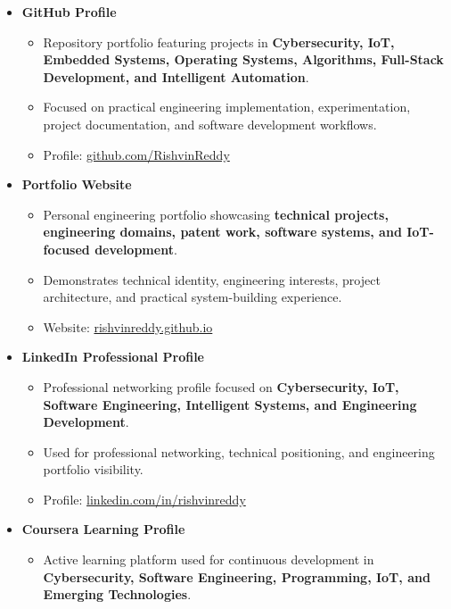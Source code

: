 \documentclass[a4paper,11pt]{article}
\begin{document}
\begin{itemize}[leftmargin=0.15in]

\item \textbf{GitHub Profile}
\begin{itemize}
    \item Repository portfolio featuring projects in \textbf{Cybersecurity, IoT, Embedded Systems, Operating Systems, Algorithms, Full-Stack Development, and Intelligent Automation}.
    
    \item Focused on practical engineering implementation, experimentation, project documentation, and software development workflows.
    
    \item Profile: \href{https://github.com/RishvinReddy}{github.com/RishvinReddy}
\end{itemize}

\item \textbf{Portfolio Website}
\begin{itemize}
    \item Personal engineering portfolio showcasing \textbf{technical projects, engineering domains, patent work, software systems, and IoT-focused development}.
    
    \item Demonstrates technical identity, engineering interests, project architecture, and practical system-building experience.
    
    \item Website: \href{https://rishvinreddy.github.io}{rishvinreddy.github.io}
\end{itemize}

\item \textbf{LinkedIn Professional Profile}
\begin{itemize}
    \item Professional networking profile focused on \textbf{Cybersecurity, IoT, Software Engineering, Intelligent Systems, and Engineering Development}.
    
    \item Used for professional networking, technical positioning, and engineering portfolio visibility.
    
    \item Profile: \href{https://www.linkedin.com/in/rishvinreddy/}{linkedin.com/in/rishvinreddy}
\end{itemize}

\item \textbf{Coursera Learning Profile}
\begin{itemize}
    \item Active learning platform used for continuous development in \textbf{Cybersecurity, Software Engineering, Programming, IoT, and Emerging Technologies}.
\end{itemize}


\end{itemize}
\end{document}
